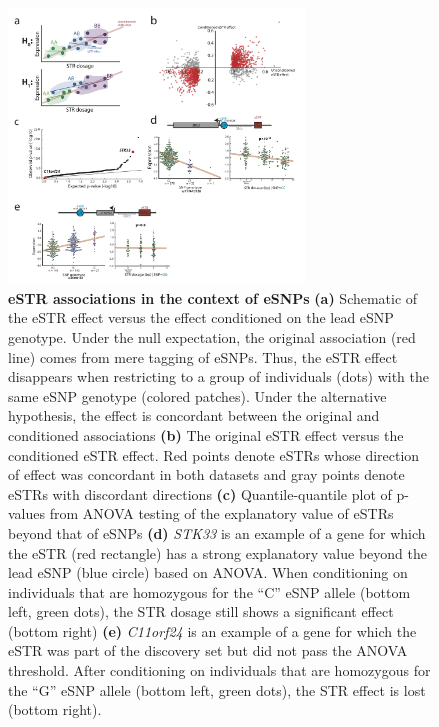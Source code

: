 \begin{figure}[h!]
\centering
\label{fig:estrfig3}
\includegraphics[width=0.7\textwidth]{Figures/Chapter4/Fig3}
\caption{\textbf{eSTR associations in the context of eSNPs} \textbf{(a)} Schematic of the eSTR effect versus the effect conditioned on the lead eSNP genotype. Under the null expectation, the original association (red line) comes from mere tagging of eSNPs. Thus, the eSTR effect disappears when restricting to a group of individuals (dots) with the same eSNP genotype (colored patches). Under the alternative hypothesis, the effect is concordant between the original and conditioned associations \textbf{(b)} The original eSTR effect versus the conditioned eSTR effect. Red points denote eSTRs whose direction of effect was concordant in both datasets and gray points denote eSTRs with discordant directions \textbf{(c)} Quantile-quantile plot of p-values from ANOVA testing of the explanatory value of eSTRs beyond that of eSNPs \textbf{(d)} \emph{STK33} is an example of a gene for which the eSTR (red rectangle) has a strong explanatory value beyond the lead eSNP (blue circle) based on ANOVA. When conditioning on individuals that are homozygous for the “C” eSNP allele (bottom left, green dots), the STR dosage still shows a significant effect (bottom right) \textbf{(e)} \emph{C11orf24} is an example of a gene for which the eSTR was part of the discovery set but did not pass the ANOVA threshold. After conditioning on individuals that are homozygous for the “G” eSNP allele (bottom left, green dots), the STR effect is lost (bottom right).}
\end{figure}

